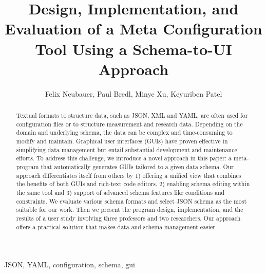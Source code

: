 \documentclass[lettersize,journal]{IEEEtran}
\begin{document}
 \title{Design, Implementation, and Evaluation of a Meta Configuration Tool Using a Schema-to-UI Approach}
 \author{Felix Neubauer, Paul Bredl, Minye Xu, Keyuriben Patel}



 \maketitle

 \begin{abstract}
 Textual formats to structure data, such as JSON, XML and YAML, are often used for configuration files or to structure measurement and research data.
 Depending on the domain and underlying schema, the data can be complex and time-consuming to modify and maintain.
 Graphical user interfaces (GUIs) have proven effective in simplifying data management but entail substantial development and maintenance efforts.
 To address this challenge, we introduce a novel approach in this paper: a meta-program that automatically generates GUIs tailored to a given data schema.
 Our approach differentiates itself from others by 1) offering a unified view that combines the benefits of both GUIs and rich-text code editors, 2) enabling schema editing within the same tool and 3) support of advanced schema features like conditions and constraints.
 We evaluate various schema formats and select JSON schema as the most suitable for our work.
 Then we present the program design, implementation, and the results of a user study involving three professors and two researchers.
 Our approach offers a practical solution that makes data and schema management easier.



 \end{abstract}

 \begin{IEEEkeywords}
  JSON, YAML, configuration, schema, gui
 \end{IEEEkeywords}
\end{document}
